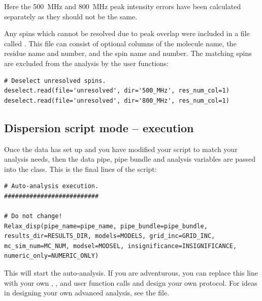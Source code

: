 Here the 500~MHz and 800~MHz peak intensity errors have been calculated separately as they should not be the same.

Any spins which cannot be resolved due to peak overlap were included in a file called .  This file can consist of optional columns of the molecule name, the residue name and number, and the spin name and number.  The matching spins are excluded from the analysis by the user functions:

\begin{lstlisting}[firstnumber=123]
# Deselect unresolved spins.
deselect.read(file='unresolved', dir='500_MHz', res_num_col=1)
deselect.read(file='unresolved', dir='800_MHz', res_num_col=1)
\end{lstlisting}


\subsection{Dispersion script mode -- execution}

Once the data has set up and you have modified your script to match your analysis needs, then the data pipe, pipe bundle and analysis variables are passed into the  class.  This is the final lines of the script:

\begin{lstlisting}[firstnumber=129]
# Auto-analysis execution.
##########################

# Do not change!
Relax_disp(pipe_name=pipe_name, pipe_bundle=pipe_bundle, results_dir=RESULTS_DIR, models=MODELS, grid_inc=GRID_INC, mc_sim_num=MC_NUM, modsel=MODSEL, insignificance=INSIGNIFICANCE, numeric_only=NUMERIC_ONLY)
\end{lstlisting}

This will start the auto-analysis.
If you are adventurous, you can replace this line with your own , , and  user function calls and design your own protocol.
For ideas in designing your own advanced analysis, see the  file.
